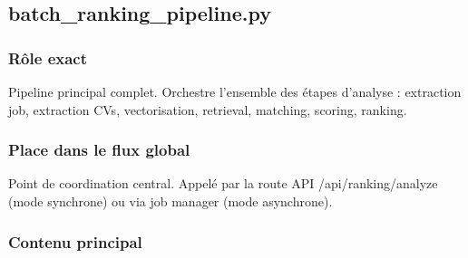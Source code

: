 \documentclass[12pt,a4paper,oneside]{book}
\begin{document}
\subsection{batch\_ranking\_pipeline.py}

\subsubsection{Rôle exact}

Pipeline principal complet. Orchestre l'ensemble des étapes d'analyse : extraction job, extraction CVs, vectorisation, retrieval, matching, scoring, ranking.

\subsubsection{Place dans le flux global}

Point de coordination central. Appelé par la route API /api/ranking/analyze (mode synchrone) ou via job manager (mode asynchrone).

\subsubsection{Contenu principal}
\end{document}
